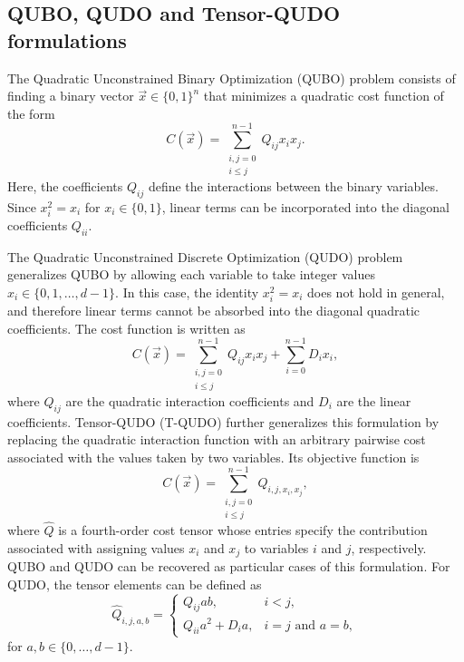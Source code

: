 \documentclass[%
 reprint,
 amsmath,amssymb,
 aps,
 pra,showkeys,
]{revtex4-2}
\begin{document}
\subsection{QUBO, QUDO and Tensor-QUDO formulations}\label{ssec:qubo_qudo_formulations}
The Quadratic Unconstrained Binary Optimization (QUBO) problem consists
of finding a binary vector $\vec{x}\in\{0,1\}^n$ that minimizes a
quadratic cost function of the form
\begin{equation}
C(\vec{x}) =
\sum_{\substack{i,j=0\\ i\leq j}}^{n-1}
Q_{ij}x_i x_j.
\end{equation}
Here, the coefficients $Q_{ij}$ define the interactions between the
binary variables. Since $x_i^2=x_i$ for $x_i\in\{0,1\}$, linear terms
can be incorporated into the diagonal coefficients $Q_{ii}$.

The Quadratic Unconstrained Discrete Optimization (QUDO) problem
generalizes QUBO by allowing each variable to take integer values $x_i\in\{0,1,\ldots,d-1\}$. In this case, the identity $x_i^2=x_i$
does not hold in general, and therefore linear terms cannot be absorbed
into the diagonal quadratic coefficients. The cost function is written as
\begin{equation}
C(\vec{x}) =
\sum_{\substack{i,j=0\\ i\leq j}}^{n-1}
Q_{ij}x_i x_j
+
\sum_{i=0}^{n-1}D_i x_i,
\end{equation}
where $Q_{ij}$ are the quadratic interaction coefficients and
$D_i$ are the linear coefficients.
Tensor-QUDO (T-QUDO) further generalizes this formulation by replacing
the quadratic interaction function with an arbitrary pairwise cost
associated with the values taken by two variables. Its objective
function is
\begin{equation}\label{eq:tqudo}
C(\vec{x}) =
\sum_{\substack{i,j=0\\ i\leq j}}^{n-1}
\hat{Q}_{i,j,x_i,x_j},
\end{equation}
where $\hat{Q}$ is a fourth-order cost tensor whose entries specify the
contribution associated with assigning values $x_i$ and $x_j$ to
variables $i$ and $j$, respectively. QUBO and QUDO can be recovered as
particular cases of this formulation. For QUDO, the tensor
elements can be defined as
\begin{equation}
\hat{Q}_{i,j,a,b} =
\begin{cases}
Q_{ij}ab, & i<j,\\
Q_{ii}a^2 + D_i a, & i=j \text{ and } a=b,
\end{cases}
\end{equation}
for $a,b\in\{0,\ldots,d-1\}$.
\end{document}
